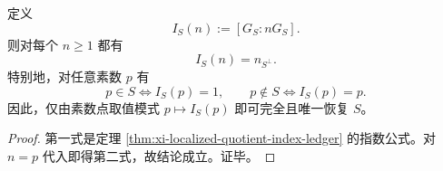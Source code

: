 \begin{corollary}[有限商指数函数在素数点上的完全恢复]\label{cor:xi-localized-quotient-index-prime-recovery}
定义
\[
I_S(n):=[G_S:nG_S].
\]
则对每个 \(n\ge 1\) 都有
\[
I_S(n)=n_{S^\perp}.
\]
特别地，对任意素数 \(p\) 有
\[
p\in S \iff I_S(p)=1,
\qquad
p\notin S \iff I_S(p)=p.
\]
因此，仅由素数点取值模式 \(p\mapsto I_S(p)\) 即可完全且唯一恢复 \(S\)。
\end{corollary}
\begin{proof}
第一式是定理 \ref{thm:xi-localized-quotient-index-ledger} 的指数公式。对 \(n=p\) 代入即得第二式，故结论成立。证毕。
\end{proof}
